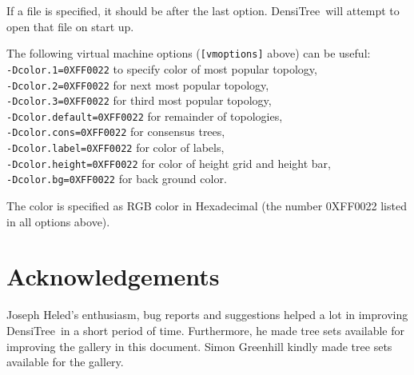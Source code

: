 \documentclass{article}
\def\DensiTree{DensiTree}
\begin{document}
If a file is specified, it should be after the last option. \DensiTree\ will attempt
to open that file on start up.

The following virtual machine options ({\tt [vmoptions]} above) can be useful:\\
{\tt -Dcolor.1=0XFF0022} to specify color of most popular topology,\\
{\tt -Dcolor.2=0XFF0022} for next most  popular topology,\\
{\tt -Dcolor.3=0XFF0022} for third most popular topology,\\
{\tt -Dcolor.default=0XFF0022} for remainder of topologies,\\
{\tt -Dcolor.cons=0XFF0022} for consensus trees,\\
{\tt -Dcolor.label=0XFF0022} for color of labels,\\
{\tt -Dcolor.height=0XFF0022} for color of height grid and height bar,\\
{\tt -Dcolor.bg=0XFF0022} for back ground color.

The color is specified as RGB color in Hexadecimal (the number 0XFF0022 listed
in all options above).


\newpage
\section{Acknowledgements}

Joseph Heled's enthusiasm, bug reports and suggestions helped a lot in improving
\DensiTree\ in a short period of time. Furthermore, he made tree sets available for
improving the gallery in this document. Simon Greenhill kindly made tree sets available 
for the gallery.
\end{document}
